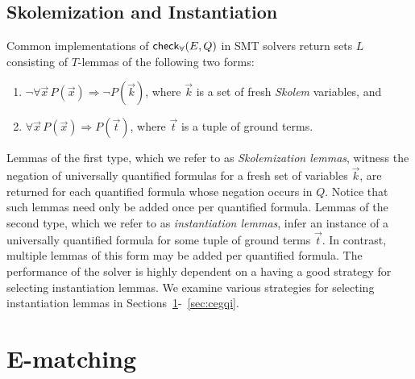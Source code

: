 \documentclass[oribibl]{llncs}
\begin{document}
\subsection{Skolemization and Instantiation}
Common implementations of $\small\mathsf{check}_\forall( E, Q )$ in SMT solvers return sets $L$ consisting of $T$-lemmas of the following two forms:
\begin{enumerate}
\item $\neg \forall \vec x\, P( \vec x ) \Rightarrow \neg P( \vec k )$, where $\vec k$ is a set of fresh \emph{Skolem} variables, and
\item $\forall \vec x\, P( \vec x ) \Rightarrow P( \vec t )$, where $\vec t$ is a tuple of ground terms.
\end{enumerate}
Lemmas of the first type, which we refer to as \emph{Skolemization lemmas},
 witness the negation of universally quantified formulas for a fresh set of variables $\vec{k}$,
are returned for each quantified formula whose negation occurs in $Q$.
Notice that such lemmas need only be added once per quantified formula.
Lemmas of the second type, which we refer to as \emph{instantiation lemmas},
infer an instance of a universally quantified formula for some tuple of ground terms $\vec{ t }$.
In contrast, multiple lemmas of this form may be added per quantified formula.
The performance of the solver is highly dependent on a having a good strategy for selecting instantiation lemmas.
We examine various strategies for selecting instantiation lemmas in Sections~\ref{sec:ematching}-~\ref{sec:cegqi}.

\section{E-matching}
\label{sec:ematching}
\end{document}
